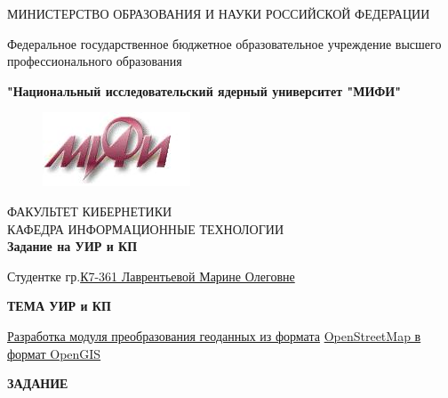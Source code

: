 \documentclass[12pt,a4paper,oneside]{article} %
\begin{document}
\singlespacing %
\pagestyle{empty} %

\newpage
\begin{center}
МИНИСТЕРСТВО ОБРАЗОВАНИЯ И НАУКИ РОССИЙСКОЙ ФЕДЕРАЦИИ

Федеральное государственное бюджетное образовательное учреждение \linebreak
высшего профессионального образования

\textbf{"Национальный исследовательский ядерный университет "МИФИ"}
\\[10pt]

\begin{figure}[h]
\includegraphics[trim=-10 40 30 0,width=0.25\linewidth]{mifi}
\end{figure}

ФАКУЛЬТЕТ КИБЕРНЕТИКИ
\\[15pt]

КАФЕДРА ИНФОРМАЦИОННЫЕ ТЕХНОЛОГИИ
\\[50pt]

\huge{\textbf{Задание на УИР и КП}}
\\[20pt]

\begin{flushleft}
\large{Студентке гр.\underline{К7-361 Лаврентьевой Марине Олеговне\hspace{5,2cm}}}
\\[40pt]
\end{flushleft}

\Large{\textbf{ТЕМА УИР и КП}}

\begin{flushleft}
\large{\underline{Разработка модуля преобразования геоданных из формата\hspace{4cm}} \linebreak
\underline{OpenStreetMap в формат OpenGIS\hspace{9,4cm}}}
\\[60pt]
\end{flushleft}

\large{\textbf{ЗАДАНИЕ}}
\end{center}
\end{document}
